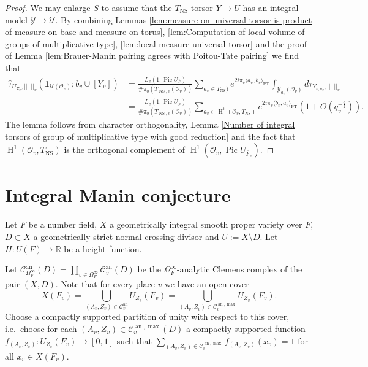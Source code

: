 \documentclass[a4paper,11pt,reqno]{amsart}
\newcommand{\R}{\mathbb{R}}
\DeclareMathOperator{\Pic}{Pic}
\DeclareMathOperator{\NS}{NS}
\DeclareMathOperator{\HH}{H}
\DeclareMathOperator{\an}{an}
\theoremstyle{definition}
\begin{document}
\begin{proof}
	We may enlarge $S$ to assume that the $T_{\NS}$-torsor $Y \to U$ has an integral model $\mathcal{Y} \to \mathcal{U}$. By combining Lemmas \ref{lem:measure on universal torsor is product of measure on base and measure on torus}, \ref{lem:Computation of local volume of groups of multiplicative type}, \ref{lem:local measure universal torsor} and the proof of Lemma \ref{lem:Brauer-Manin pairing agrees with Poitou-Tate pairing} we find that
	\[
	\begin{split}
		 \hat{\tau}_{U_{Z_v}, ||\cdot||_v}
		 (\mathbf{1}_{\mathcal{U}(\mathcal{O}_v)} ; b_v \cup [Y_v]) &= \frac{L_v(1, \Pic U_{\overline{F}})}{\# \pi_0(T_{\NS, v}(\mathcal{O}_v))}\sum_{a_v \in T_{\NS})} e^{2 i \pi_v \langle a_v, b_v \rangle_{\mathrm{PT}}} \int_{\mathcal{Y}_{a_v}(\mathcal{O}_v)} d\tau_{Y_{v, a_v}, ||\cdot||_v} \\ &= \frac{L_v(1, \Pic U_{\overline{F}})}{\# \pi_0(T_{\NS, v}(\mathcal{O}_v))} \sum_{a_v \in \HH^1(\mathcal{O}_v, T_{\NS})} e^{2 i \pi_v \langle b_v, a_v \rangle_{\mathrm{PT}}} \left(1 + O(q_v^{-\frac{3}{2}}) \right).
	\end{split}
	\]
	The lemma follows from character orthogonality, Lemma \ref{Number of integral torsors of group of multiplicative type with good reduction} and the fact that $\HH^1(\mathcal{O}_v, T_{\NS})$ is the orthogonal complement of $\HH^1(\mathcal{O}_v, \Pic U_{\bar{F}_v})$.
\end{proof}
\section{Integral Manin conjecture}
Let $F$ be a number field, $X$ a geometrically integral smooth proper variety over $F$, $D \subset X$ a geometrically strict normal crossing divisor and $U := X \setminus D$. Let $H: U(F) \to \R$ be a height function.

Let $\mathcal{C}^{\an}_{\Omega_{F}^{\infty}}(D) = \prod_{v \in \Omega_{F}^{\infty}} \mathcal{C}^{\an}_v(D)$ be the $\Omega_{F}^{\infty}$-analytic Clemens complex of the pair $(X,D)$. Note that for every place $v$ we have an open cover
\begin{equation*}
	X(F_v) = \bigcup_{(A_v, Z_v) \in \mathcal{C}^{\an}_v} U_{Z_v}(F_v) = \bigcup_{(A_v, Z_v) \in \mathcal{C}^{\an, \max}_v} U_{Z_v}(F_v).
\end{equation*}
Choose a compactly supported partition of unity with respect to this cover, i.e.~choose for each $(A_v, Z_v) \in \mathcal{C}^{\an, \max}_v(D)$ a compactly supported function $f_{(A_v, Z_v)}: U_{Z_v}(F_v) \to [0, 1]$ such that $\sum_{(A_v, Z_v) \in \mathcal{C}^{\an, \max}_v} f_{(A_v, Z_v)}(x_v) = 1$ for all $x_v \in X(F_v)$. 
 
\end{document}

